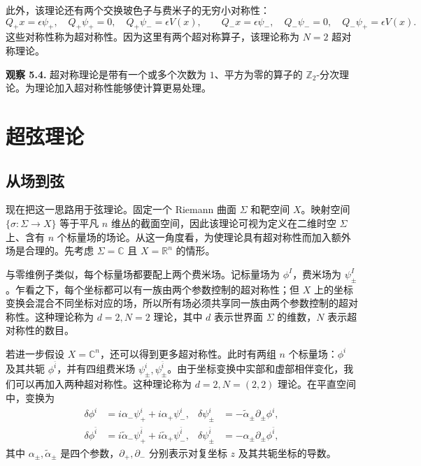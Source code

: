 此外，该理论还有两个交换玻色子与费米子的无穷小对称性：
\[
  Q_+x=\epsilon\psi_+,\quad Q_+\psi_+=0,\quad Q_+\psi_-=\epsilon V(x),
  \qquad
  Q_-x=\epsilon\psi_-,\quad Q_-\psi_-=0,\quad Q_-\psi_+=\epsilon V(x).
\]
这些对称性称为超对称性。因为这里有两个超对称算子，该理论称为 $N=2$ 超对称理论。

\begin{note}\label{note:susy-observation}
\textbf{观察 5.4.} 超对称理论是带有一个或多个次数为 $1$、平方为零的算子的 $\mathbb Z_2$-分次理论。为理论加入超对称性能够使计算更易处理。
\end{note}

\section{超弦理论}
\subsection{从场到弦}
现在把这一思路用于弦理论。固定一个 Riemann 曲面 $\Sigma$ 和靶空间 $X$。映射空间 $\{\sigma\colon\Sigma\to X\}$ 等于平凡 $n$ 维丛的截面空间，因此该理论可视为定义在二维时空 $\Sigma$ 上、含有 $n$ 个标量场的场论。从这一角度看，为使理论具有超对称性而加入额外场是合理的。先考虑 $\Sigma=\mathbb C$ 且 $X=\mathbb R^n$ 的情形。

与零维例子类似，每个标量场都要配上两个费米场。记标量场为 $\phi^I$，费米场为 $\psi_\pm^I$。乍看之下，每个坐标都可以有一族由两个参数控制的超对称性；但 $X$ 上的坐标变换会混合不同坐标对应的场，所以所有场必须共享同一族由两个参数控制的超对称性。这种理论称为 $d=2,N=2$ 理论，其中 $d$ 表示世界面 $\Sigma$ 的维数，$N$ 表示超对称性的数目。

若进一步假设 $X=\mathbb C^n$，还可以得到更多超对称性。此时有两组 $n$ 个标量场：$\phi^i$ 及其共轭 $\phi^{\bar i}$，并有四组费米场 $\psi^i_\pm,\psi^{\bar i}_\pm$。由于坐标变换中实部和虚部相伴变化，我们可以再加入两种超对称性。这种理论称为 $d=2,N=(2,2)$ 理论。在平直空间中，变换为
\[
\begin{aligned}
  \delta\phi^i&=i\alpha_-\psi^i_++i\alpha_+\psi^i_-,&
  \delta\psi^i_\pm&=-\widetilde\alpha_\pm\partial_\pm\phi^i,\\
  \delta\phi^{\bar i}&=i\widetilde\alpha_-\psi^{\bar i}_+
                       +i\widetilde\alpha_+\psi^{\bar i}_-,&
  \delta\psi^{\bar i}_\pm&=-\alpha_\pm\partial_\pm\phi^{\bar i},
\end{aligned}
\]
其中 $\alpha_\pm,\widetilde\alpha_\pm$ 是四个参数，$\partial_+,\partial_-$ 分别表示对复坐标 $z$ 及其共轭坐标的导数。

